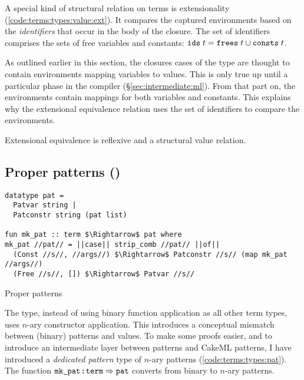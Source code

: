 A special kind of structural relation on terms is extensionality (\cref{code:terms:types:value:ext}).
It compares the captured environments based on the \emph{identifiers} that occur in the body of the closure.
The set of identifiers comprises the sets of free variables and constants: $\texttt{\textup{ids}}\;t = \texttt{\textup{frees}}\;t \cup \texttt{\textup{consts}}\;t$.

As outlined earlier in this section, the closures cases of the  type are thought to contain environments mapping variables to values.
This is only true up until a particular phase in the compiler (§\ref{sec:intermediate:ml}).
From that part on, the environments contain mappings for both variables and constants.
This explains why the extensional equivalence relation uses the set of identifiers to compare the environments.

\begin{lemma}
  Extensional equivalence is reflexive and a structural value relation.
\end{lemma}

\subsection{Proper patterns ()}
\label{sec:terms:types:pat}

\begin{code}[t]
  \begin{lstlisting}[language=Isabelle]
datatype pat =
  Patvar string |
  Patconstr string (pat list)

fun mk_pat :: term $\Rightarrow$ pat where
mk_pat //pat// = ||case|| strip_comb //pat// ||of||
  (Const //s//, //args//) $\Rightarrow$ Patconstr //s// (map mk_pat //args//)
  (Free //s//, []) $\Rightarrow$ Patvar //s//\end{lstlisting}
  \caption{Proper patterns}
  \label{code:terms:types:pat}
\end{code}

The  type, instead of using binary function application as all other term types, uses $n$-ary constructor application.
This introduces a conceptual mismatch between (binary) patterns and values.
To make some proofs easier, and to introduce an intermediate layer between  patterns and CakeML patterns, I have introduced a \emph{dedicated pattern} type of $n$-ary patterns (\cref{code:terms:types:pat}).
The function $\texttt{\textup{mk\_pat}} \mathbin{:\!\!:} \texttt{\textup{term}} \Rightarrow \texttt{\textup{pat}}$ converts from binary to $n$-ary patterns.

